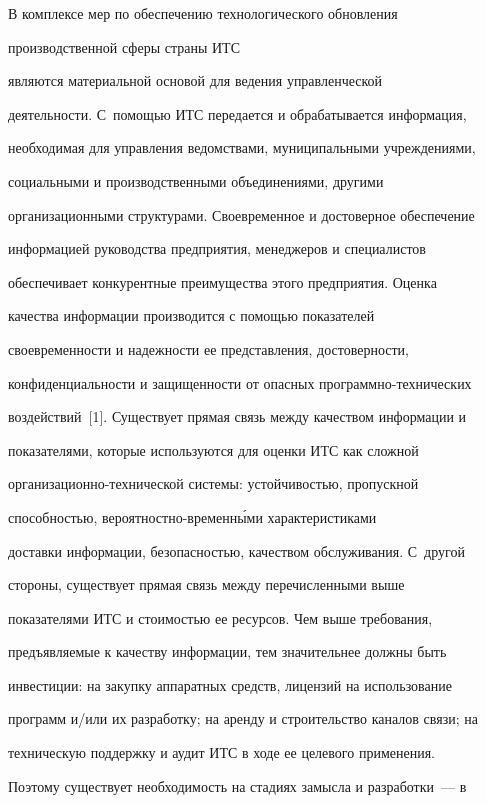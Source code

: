         


        В комплексе мер по обеспечению технологического обновления 


производственной сферы страны ИТС 


являются материальной основой для ведения управленческой 


деятельности. С~помощью ИТС передается и обрабатывается информация, 


необходимая для управления ведомствами, муниципальными учреждениями, 


социальными и производственными объединениями, другими 


организационными структурами. Своевременное и достоверное обеспечение 


информацией руководства предприятия, менеджеров и специалистов 


обеспечивает конкурентные преимущества этого предприятия. Оценка 


качества информации производится с помощью показателей 


своевременности и надежности ее представления, достоверности, 


конфиденциальности и защищенности от опасных программно-технических 


воздействий~[1]. Существует прямая связь между качеством информации и 


показателями, которые используются для оценки ИТС как сложной 


организационно-технической системы: устойчивостью, пропускной 


способностью, ве\-ро\-ят\-но\-ст\-но-вре\-мен\-н\'{ы}\-ми характеристиками 


доставки информации, безопасностью, качеством обслуживания. С~другой 


стороны, существует прямая связь между перечисленными выше 


показателями ИТС и стоимостью ее ресурсов. Чем выше требования, 


предъявляемые к качеству информации, тем значительнее должны быть 


инвестиции: на закупку аппаратных средств, лицензий на использование 


программ и/или их разработку; на аренду и строительство каналов связи; на 


техническую поддержку и аудит ИТС в ходе ее целевого применения. 


Поэтому существует необходимость на стадиях замысла и разработки~--- в 


